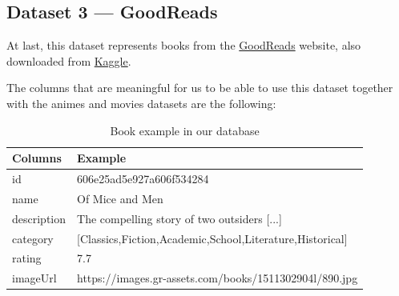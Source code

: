 \documentclass{article}
\newcommand*\fpar{\hspace{1ex}}
\begin{document}
  \subsection{Dataset 3 — GoodReads}
  \label{sec:books}
  \fpar At last, this dataset represents books from the \href{https://www.goodreads.com/}{GoodReads} website, also downloaded from \href{https://www.kaggle.com/meetnaren/goodreads-best-books}{Kaggle}.
  \par The columns that are meaningful for us to be able to use this dataset together with the animes and movies datasets are the following:
  \begin{table}[H]
    \centering
    \begin{tabular}{l|l}
      Columns & Example                       \\ \hline
      id      & 606e25ad5e927a606f534284      \\
      name    & Of Mice and Men               \\
      description & The compelling story of two outsiders [...]           \\
      category& [Classics,Fiction,Academic,School,Literature,Historical]  \\
      rating  & 7.7                           \\
      imageUrl& https://images.gr-assets.com/books/1511302904l/890.jpg
    \end{tabular}
    \caption{Book example in our database}
    \label{table:book}
  \end{table}

\clearpage
\end{document}
